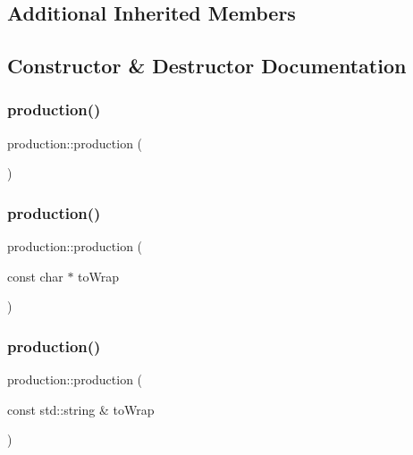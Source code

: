 \subsection*{Additional Inherited Members}


\subsection{Constructor \& Destructor Documentation}
\mbox{\label{classproduction_a3af2c3bd9ccd022413594f9833c27484}} 
\subsubsection{\texorpdfstring{production()}{production()}\hspace{0.1cm}{\footnotesize\ttfamily [1/6]}}
{\footnotesize\ttfamily production\+::production (\begin{DoxyParamCaption}{ }\end{DoxyParamCaption})\hspace{0.3cm}{\ttfamily [inline]}}

\mbox{\label{classproduction_a0325b1a1d63eb61469e269cbd294693b}} 
\subsubsection{\texorpdfstring{production()}{production()}\hspace{0.1cm}{\footnotesize\ttfamily [2/6]}}
{\footnotesize\ttfamily production\+::production (\begin{DoxyParamCaption}\item[{const char $\ast$}]{to\+Wrap }\end{DoxyParamCaption})\hspace{0.3cm}{\ttfamily [inline]}}

\mbox{\label{classproduction_a54c1f3e403971c8a6ef4e88655e2ee41}} 
\subsubsection{\texorpdfstring{production()}{production()}\hspace{0.1cm}{\footnotesize\ttfamily [3/6]}}
{\footnotesize\ttfamily production\+::production (\begin{DoxyParamCaption}\item[{const std\+::string \&}]{to\+Wrap }\end{DoxyParamCaption})\hspace{0.3cm}{\ttfamily [inline]}}

